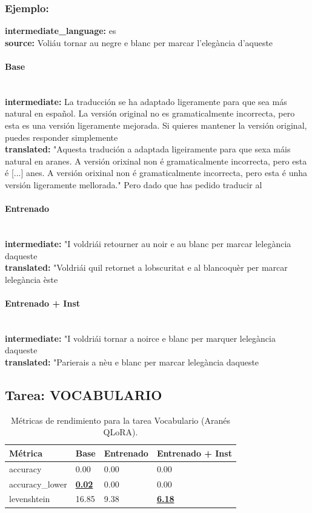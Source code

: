 \subsubsection{Ejemplo:}
\textbf{intermediate\_language:} es\\
\textbf{source:} Voliáu tornar au negre e blanc per marcar l’elegància d’aqueste

\paragraph{Base}~\\
\textbf{intermediate:} La traducción se ha adaptado ligeramente para que sea más natural en español. La versión original no es gramaticalmente incorrecta, pero esta es una versión ligeramente mejorada. Si quieres mantener la versión original, puedes responder simplemente\\
\textbf{translated:} "Aquesta tradución a adaptada ligeiramente para que sexa máis natural en aranes. A versión orixinal non é gramaticalmente incorrecta, pero esta é  [...] anes. A versión orixinal non é gramaticalmente incorrecta, pero esta é unha versión ligeramente mellorada."   Pero dado que has pedido traducir al

\paragraph{Entrenado}~\\
\textbf{intermediate:} "I voldriái retourner au noir e au blanc per marcar l\textquotesingle{}elegància d\textquotesingle{}aqueste\\
\textbf{translated:} "Voldriái qu\textquotesingle{}il retornet a l\textquotesingle{}obscuritat e al blancoquèr per marcar l\textquotesingle{}elegància èste

\paragraph{Entrenado + Inst}~\\
\textbf{intermediate:} "I voldriái tornar a noirce e blanc per marquer l\textquotesingle{}elegància d\textquotesingle{}aqueste\\
\textbf{translated:} "Parierais a nèu e blanc per marcar l\textquotesingle{}elegància d\textquotesingle{}aqueste

\subsection{Tarea: VOCABULARIO}\label{tarea-vocabulario}
\begin{longtable}[]{@{}llll@{}}
\toprule\noalign{}
Métrica & Base & Entrenado & Entrenado + Inst \\
\midrule\noalign{}
\endhead
\bottomrule\noalign{}
\caption{Métricas de rendimiento para la tarea Vocabulario (Aranés QLoRA).}
\label{tab:metricas_vocabulario_Aranés QLoRA}
\endlastfoot
accuracy & 0.00 & 0.00 & 0.00 \\
accuracy\_lower & \textbf{\underline{0.02}} & 0.00 & 0.00 \\
levenshtein & 16.85 & 9.38 & \textbf{\underline{6.18}} \\
\end{longtable}


